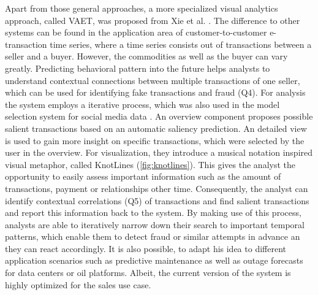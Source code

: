 \documentclass[electronic]{vgtc}             %
\begin{document}
Apart from those general approaches, a more specialized visual analytics approach, called VAET, was proposed from Xie et al. \cite{Xie:2014}.
The difference to other systems can be found in the application area of customer-to-customer e-transaction time series, where a time series consists out of transactions between a seller and a buyer.
However, the commodities as well as the buyer can vary greatly.
Predicting behavioral pattern into the future helps analysts to understand contextual connections between multiple transactions of one seller, which can be used for identifying fake transactions and fraud (Q4).
For analysis the system employs a iterative process, which was also used in the model selection system for social media data \cite{koepp:2014}.
An overview component proposes possible salient transactions based on an automatic saliency prediction. 
An detailed view is used to gain more insight on specific transactions, which were selected by the user in the overview.
For visualization, they introduce a musical notation inspired visual metaphor, called KnotLines (\autoref{fig:knotlines}).
This gives the analyst the opportunity to easily assess important information such as the amount of transactions, payment or relationships other time. 
Consequently, the analyst can identify contextual correlations (Q5) of transactions and find salient transactions and report this information back to the system. 
By making use of this process, analysts are able to iteratively narrow down their search to important temporal patterns, which enable them to detect fraud or similar attempts in advance an they can react accordingly. 
It is also possible, to adapt his idea to different application scenarios such as predictive maintenance as well as outage forecasts for data centers or oil platforms.
Albeit, the current version of the system is highly optimized for the sales use case. 
\end{document}
